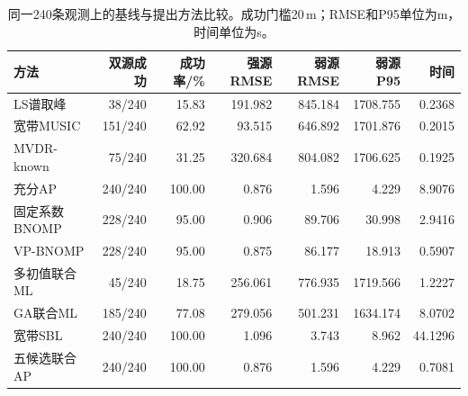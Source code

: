 \begin{table}[pos=H]\centering\small
\caption{同一240条观测上的基线与提出方法比较。成功门槛20\,m；RMSE和P95单位为m，时间单位为s。}\label{tab:formalcommon}
\begin{tabular}{@{}lrrrrrr@{}}\toprule
方法 & 双源成功 & 成功率/\% & 强源RMSE & 弱源RMSE & 弱源P95 & 时间\\\midrule
LS谱取峰 & 38/240 & 15.83 & 191.982 & 845.184 & 1708.755 & 0.2368\\
宽带MUSIC & 151/240 & 62.92 & 93.515 & 646.892 & 1701.876 & 0.2015\\
MVDR-known & 75/240 & 31.25 & 320.684 & 804.082 & 1706.625 & 0.1925\\
充分AP & 240/240 & 100.00 & 0.876 & 1.596 & 4.229 & 8.9076\\
固定系数BNOMP & 228/240 & 95.00 & 0.906 & 89.706 & 30.998 & 2.9416\\
VP-BNOMP & 228/240 & 95.00 & 0.875 & 86.177 & 18.913 & 0.5907\\
多初值联合ML & 45/240 & 18.75 & 256.061 & 776.935 & 1719.566 & 1.2227\\
GA联合ML & 185/240 & 77.08 & 279.056 & 501.231 & 1634.174 & 8.0702\\
宽带SBL & 240/240 & 100.00 & 1.096 & 3.743 & 8.962 & 44.1296\\
五候选联合AP & 240/240 & 100.00 & 0.876 & 1.596 & 4.229 & 0.7081\\
\bottomrule\end{tabular}\end{table}
